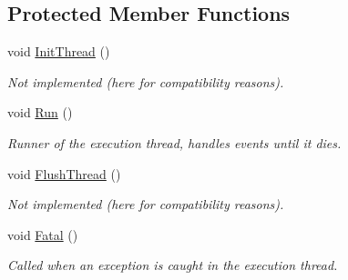 \subsection*{Protected Member Functions}
\begin{DoxyCompactItemize}
\item 
\hypertarget{class_event_collector_a5856093a6f5813af9a8ff5b6d086d159}{void \hyperlink{class_event_collector_a5856093a6f5813af9a8ff5b6d086d159}{Init\-Thread} ()}\label{class_event_collector_a5856093a6f5813af9a8ff5b6d086d159}

\begin{DoxyCompactList}\small\item\em Not implemented (here for compatibility reasons). \end{DoxyCompactList}\item 
\hypertarget{class_event_collector_a5432f799527c116921834de45db7db52}{void \hyperlink{class_event_collector_a5432f799527c116921834de45db7db52}{Run} ()}\label{class_event_collector_a5432f799527c116921834de45db7db52}

\begin{DoxyCompactList}\small\item\em Runner of the execution thread, handles events until it dies. \end{DoxyCompactList}\item 
\hypertarget{class_event_collector_aae0e6be4959f8649e581dd4b1b58ed49}{void \hyperlink{class_event_collector_aae0e6be4959f8649e581dd4b1b58ed49}{Flush\-Thread} ()}\label{class_event_collector_aae0e6be4959f8649e581dd4b1b58ed49}

\begin{DoxyCompactList}\small\item\em Not implemented (here for compatibility reasons). \end{DoxyCompactList}\item 
\hypertarget{class_event_collector_af3ec06337a16aab00debe03334fe3955}{void \hyperlink{class_event_collector_af3ec06337a16aab00debe03334fe3955}{Fatal} ()}\label{class_event_collector_af3ec06337a16aab00debe03334fe3955}

\begin{DoxyCompactList}\small\item\em Called when an exception is caught in the execution thread. \end{DoxyCompactList}\end{DoxyCompactItemize}
